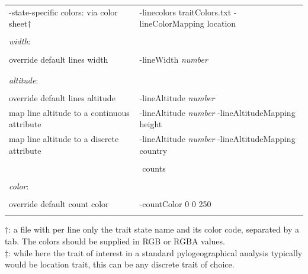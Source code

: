 \documentclass[english]{paper}
\begin{document}
\begin{table}[!ht]
\begin{tabular}{ll}
	-state-specific colors: via color sheet$\dagger$&-linecolors traitColors.txt -lineColorMapping location		\\
								&						\\
\textit{width}:					&						\\
								&						\\
	override default lines width		&-lineWidth \textit{number}	\\
								&						\\
								&						\\
\textit{altitude}:				&						\\
								&						\\
override default lines altitude			&-lineAltitude  \textit{number}	\\
map line altitude to a continuous attribute	&-lineAltitude  \textit{number} -lineAltitudeMapping height	\\
map line altitude to a discrete attribute	&-lineAltitude  \textit{number} -lineAltitudeMapping country\\
								&						\\
\midrule
			\multicolumn{2}{c}{counts}				\\
\midrule
								&						\\
\textit{color}:					&						\\
								&						\\
override default count color			&	-countColor 0 0 250		\\
								&						\\
\bottomrule
\end{tabular}
\begin{flushleft}
{\footnotesize 
$\dagger$: a file with per line only the trait state name and its color code, separated by a tab. The colors should be supplied in RGB or RGBA values.
\\
$\ddagger$: while here the trait of interest in a standard pylogeographical analysis  typically would be location trait, this can be any discrete trait of choice.
} 
\end{flushleft}
\label{tab:options}
 \end{table}
\end{document}
